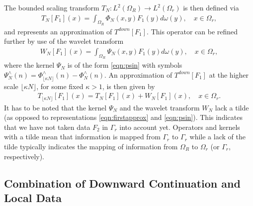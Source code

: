 \documentclass[a4paper, 10pt]{article}
\numberwithin{equation}{section}
\theoremstyle{definition}
\begin{document}
The bounded scaling transform $T_N:L^2(\Omega_R)\to L^2(\Omega_r)$ is then defined via 
\begin{align}\label{eqn:TjRr}
{{T}_N[F_1](x)=\int_{\Omega_R}\Phi_N(x,y) F_1(y)d\omega(y),\quad x\in\Omega_r,}
\end{align}
and represents an approximation of $T^{down}[F_1]$. This operator can be refined further by use of the wavelet transform
\begin{align}\label{eqn:WjRr}
{W}_N[F_1](x)=\int_{\Omega_R}\Psi_N(x,y) F_1(y)d\omega(y),\quad x\in\Omega_r,
\end{align}
where the kernel $\Psi_N$ is of the form \eqref{eqn:psin} with symbols $\Psi_N^\wedge(n)=\Phi_{\lfloor\kappa N\rfloor}^\wedge(n)-\Phi_N^\wedge(n)$. An approximation of $T^{down}[F_1]$ at the higher scale $\lfloor\kappa N\rfloor$, for some fixed $\kappa>1$, is then given by 
\begin{align}\label{eqn:multirep1}
{T}_{\lfloor\kappa N\rfloor}[F_1](x)={T}_N[F_1](x)+W_N[F_1](x),\quad x\in\Omega_r.
\end{align}
It has to be noted that the kernel $\Psi_N$ and the wavelet transform $W_N$ lack a tilde (as opposed to representations \eqref{eqn:firstapprox} and \eqref{eqn:psin}). This indicates that we have not taken data $F_2$ in $\Gamma_r$ into account yet. Operators and kernels with a tilde mean that information is mapped from $\Gamma_r$ to $\Gamma_r$ while a lack of the tilde typically indicates the mapping of information from $\Omega_R$ to $\Omega_r$ (or $\Gamma_r$, respectively). 

\subsection{Combination of Downward Continuation and Local Data}\label{subsec:comb}
\end{document}
